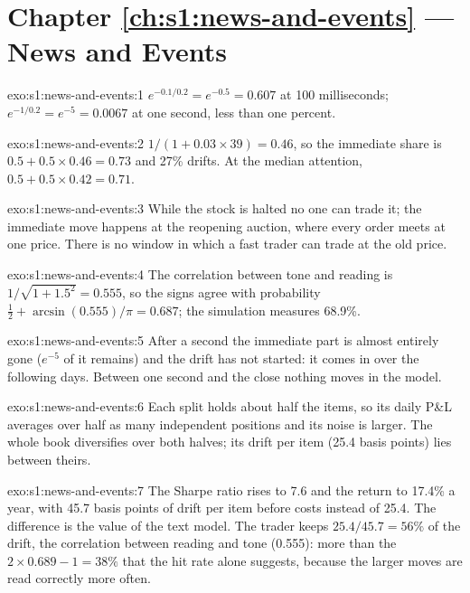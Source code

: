 \section*{Chapter \ref{ch:s1:news-and-events} --- News and Events}

\begin{solution}{exo:s1:news-and-events:1}
$e^{-0.1/0.2} = e^{-0.5} = 0.607$ at 100 milliseconds; $e^{-1/0.2} = e^{-5} = 0.0067$ at one second, less than one percent.
\end{solution}

\begin{solution}{exo:s1:news-and-events:2}
$1/(1 + 0.03 \times 39) = 0.46$, so the immediate share is $0.5 + 0.5 \times 0.46 = 0.73$ and 27\% drifts. At the median attention, $0.5 + 0.5 \times 0.42
= 0.71$.
\end{solution}

\begin{solution}{exo:s1:news-and-events:3}
While the stock is halted no one can trade it; the immediate move happens at the reopening auction, where every order meets at one price. There is no
window in which a fast trader can trade at the old price.
\end{solution}

\begin{solution}{exo:s1:news-and-events:4}
The correlation between tone and reading is $1/\sqrt{1 + 1.5^2} = 0.555$, so the signs agree with probability $\tfrac12 + \arcsin(0.555)/\pi = 0.687$;
the simulation measures 68.9\%.
\end{solution}

\begin{solution}{exo:s1:news-and-events:5}
After a second the immediate part is almost entirely gone ($e^{-5}$ of it remains) and the drift has not started: it comes in over the following days.
Between one second and the close nothing moves in the model.
\end{solution}

\begin{solution}{exo:s1:news-and-events:6}
Each split holds about half the items, so its daily P\&L averages over half as many independent positions and its noise is larger. The whole book
diversifies over both halves; its drift per item (25.4 basis points) lies between theirs.
\end{solution}

\begin{solution}{exo:s1:news-and-events:7}
The Sharpe ratio rises to 7.6 and the return to 17.4\% a year, with 45.7 basis points of drift per item before costs instead of 25.4. The difference is the
value of the text model. The trader keeps $25.4/45.7 = 56\%$ of the drift, the correlation between reading and tone (0.555): more than the
$2 \times 0.689 - 1 = 38\%$ that the hit rate alone suggests, because the larger moves are read correctly more often.
\end{solution}

